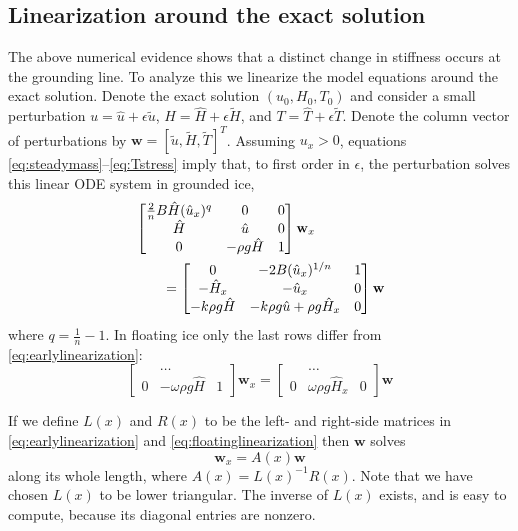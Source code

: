 \documentclass[review,letterpaper]{igs}
\newcommand{\bw}{\mathbf{w}}
\newcommand{\hu}{\hat u}
\newcommand{\hH}{\hat H}
\newcommand{\hT}{\hat T}
\newcommand{\tu}{\tilde u}
\newcommand{\tH}{\tilde H}
\newcommand{\tT}{\tilde T}
\newcommand{\eps}{\epsilon}
\begin{document}
\subsection*{Linearization around the exact solution}  The above numerical evidence shows that a distinct change in stiffness occurs at the grounding line.  To analyze this we linearize the model equations around the exact solution.  Denote the exact solution $(u_0,H_0,T_0)$ and consider a small perturbation $u = \hu + \eps \tu$, $H = \hH + \eps \tH$, and $T = \hT + \eps \tT$.  Denote the column vector of perturbations by $\bw = [\tu, \tH, \tT]^T$.  Assuming $u_x > 0$, equations \eqref{eq:steadymass}--\eqref{eq:Tstress} imply that, to first order in $\eps$, the perturbation solves this linear ODE system in grounded ice,
\begin{align}
&\begin{bmatrix}
\frac{2}{n} B \hH (\hu_x)^q & 0 & 0 \\
\hH & \hu & 0 \\
0 & -\rho g \hH & 1
\end{bmatrix}
\bw_x \notag \\
&\qquad =
\begin{bmatrix}
0 & - 2 B (\hu_x)^{1/n} & 1 \\
- \hH_x & - \hu_x & 0 \\
-k \rho g \hH & - k \rho g \hu + \rho g \hH_x & 0
\end{bmatrix}
\bw  \label{eq:earlylinearization}
\end{align}
where $q = \frac{1}{n} - 1$.  In floating ice only the last rows differ from \eqref{eq:earlylinearization}:
\begin{equation}
\begin{bmatrix}
 & \dots & \\
0 & - \omega \rho g \hH & 1
\end{bmatrix}
\bw_x
=
\begin{bmatrix}
 & \dots & \\
0 & \omega \rho g \hH_x & 0
\end{bmatrix}
\bw
\label{eq:floatinglinearization}
\end{equation}

If we define $L(x)$ and $R(x)$ to be the left- and right-side matrices in \eqref{eq:earlylinearization} and \eqref{eq:floatinglinearization} then $\bw$ solves
\begin{equation}
\bw_x = A(x) \bw \label{eq:linearization}
\end{equation}
along its whole length, where $A(x) = L(x)^{-1} R(x)$.  Note that we have chosen $L(x)$ to be lower triangular.  The inverse of $L(x)$ exists, and is easy to compute, because its diagonal entries are nonzero.
\end{document}
